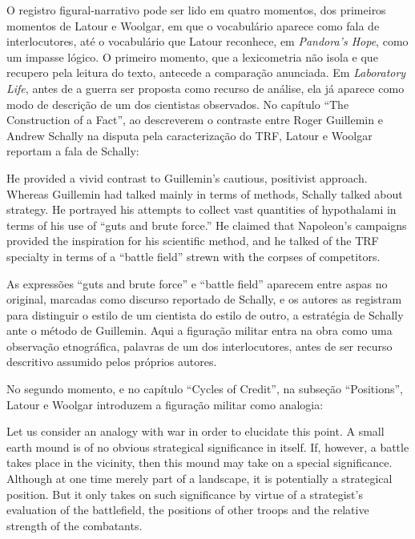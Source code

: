 O registro figural-narrativo pode ser lido em quatro momentos, dos primeiros momentos de Latour e Woolgar, em que o vocabulário aparece como fala de interlocutores, até o vocabulário que Latour reconhece, em \emph{Pandora's Hope}, como um impasse lógico. O primeiro momento, que a lexicometria não isola e que recupero pela leitura do texto, antecede a comparação anunciada. Em \emph{Laboratory Life}, antes de a guerra ser proposta como recurso de análise, ela já aparece como modo de descrição de um dos cientistas observados. No capítulo \enquote{The Construction of a Fact}, ao descreverem o contraste entre Roger Guillemin e Andrew Schally na disputa pela caracterização do TRF, Latour e Woolgar reportam a fala de Schally:

\begin{citacaoabnt}
He provided a vivid contrast to Guillemin's cautious, positivist approach. Whereas Guillemin had talked mainly in terms of methods, Schally talked about strategy. He portrayed his attempts to collect vast quantities of hypothalami in terms of his use of \enquote{guts and brute force.} He claimed that Napoleon's campaigns provided the inspiration for his scientific method, and he talked of the TRF specialty in terms of a \enquote{battle field} strewn with the corpses of competitors. \parencite[p.~130]{latour_woolgar_1986_lab_life}
\end{citacaoabnt}

As expressões \enquote{guts and brute force} e \enquote{battle field} aparecem entre aspas no original, marcadas como discurso reportado de Schally, e os autores as registram para distinguir o estilo de um cientista do estilo de outro, a estratégia de Schally ante o método de Guillemin. Aqui a figuração militar entra na obra como uma observação etnográfica, palavras de um dos interlocutores, antes de ser recurso descritivo assumido pelos próprios autores. 

No segundo momento, e no capítulo \enquote{Cycles of Credit}, na subseção \enquote{Positions}, Latour e Woolgar introduzem a figuração militar como analogia:

\begin{citacaoabnt}
Let us consider an analogy with war in order to elucidate this point. A small earth mound is of no obvious strategical significance in itself. If, however, a battle takes place in the vicinity, then this mound may take on a special significance. Although at one time merely part of a landscape, it is potentially a strategical position. But it only takes on such significance by virtue of a strategist's evaluation of the battlefield, the positions of other troops and the relative strength of the combatants. \parencite[p.~211--212]{latour_woolgar_1986_lab_life}
\end{citacaoabnt}

